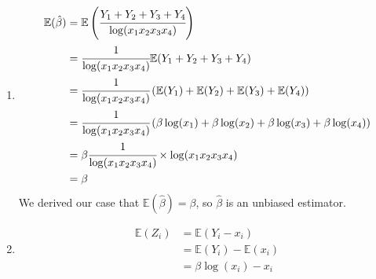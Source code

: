 \documentclass[12pt, oneside, a4paper]{article}
\begin{document}
\begin{enumerate}
\begin{enumerate}[label = (\alph*)]
			\item \begin{align*}
				\mathbb{E}(\hat{\beta}) & = \mathbb{E}\left(\cfrac{Y_1 + Y_2 + Y_3 + Y_4}{\log(x_1x_2x_3x_4)}\right) \\
				& = \cfrac{1}{\log(x_1x_2x_3x_4)}\mathbb{E}(Y_1 + Y_2 + Y_3 + Y_4) \\
				& = \cfrac{1}{\log(x_1x_2x_3x_4)}\left( \mathbb{E}(Y_1) +\mathbb{E}(Y_2)+\mathbb{E}(Y_3)+\mathbb{E}(Y_4)\right) \\
				& =  \cfrac{1}{\log(x_1x_2x_3x_4)}\left(\beta \log(x_1)+\beta \log(x_2)+\beta \log(x_3)+\beta \log(x_4)\right)\\
				& = \beta  \cfrac{1}{\log(x_1x_2x_3x_4)}\times \log(x_1x_2x_3x_4)\\
				& = \beta
			\end{align*}
			We derived our case that $\mathbb{E}(\hat{\beta}) = \beta$, so $\hat{\beta}$ is an unbiased estimator.
			\item \begin{align*}
				\mathbb{E}(Z_i) & = \mathbb{E}(Y_i - x_i)\\
				& = \mathbb{E}(Y_i) - \mathbb{E}(x_i)\\
				& = \beta \log(x_i) - x_i
			\end{align*}
		\end{enumerate}
	\end{enumerate}
\end{document}
